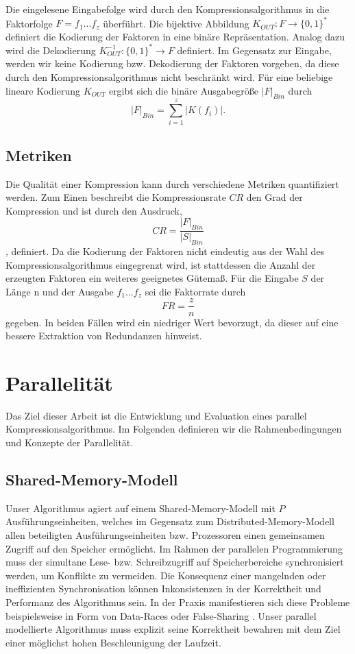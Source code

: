 Die eingelesene Eingabefolge wird durch den Kompressionsalgorithmus in die Faktorfolge $F=f_1...f_z$ überführt. Die bijektive Abbildung $K_{OUT}: F \rightarrow \{0,1\}^*$
definiert die Kodierung der Faktoren in eine binäre Repräsentation. Analog dazu wird die Dekodierung $K^{-1}_{OUT}: \{0,1\}^* \rightarrow F$ definiert. Im Gegensatz zur Eingabe, 
werden wir keine Kodierung bzw. Dekodierung der Faktoren vorgeben, da diese durch den Kompressionsalgorithmus nicht beschränkt wird. Für eine beliebige lineare Kodierung $K_{OUT}$ ergibt 
sich die binäre Ausgabegröße $|F|_{Bin}$ durch
\begin{equation}
    |F|_{Bin} = \sum_{i=1}^{z} |K(f_i)|.
\end{equation}

\subsection{Metriken}
Die Qualität einer Kompression kann durch verschiedene Metriken quantifiziert werden. Zum Einen beschreibt die Kompressionsrate $CR$ den Grad der Kompression und ist durch den
Ausdruck, 
\begin{equation}
    CR = \frac{|F|_{Bin}}{|S|_{Bin}}
\end{equation}
, definiert.
Da die Kodierung der Faktoren nicht eindeutig aus der Wahl des Kompressionsalgorithmus eingegrenzt wird, ist stattdessen die Anzahl der erzeugten Faktoren ein
weiteres geeignetes Gütemaß. Für die Eingabe $S$ der Länge n und der Ausgabe $f_1...f_z$ sei die Faktorrate durch
\begin{equation}
    FR = \frac{z}{n}
\end{equation}
gegeben. In beiden Fällen wird ein niedriger Wert bevorzugt, da dieser auf eine bessere Extraktion von Redundanzen hinweist.

\section{Parallelität}
Das Ziel dieser Arbeit ist die Entwicklung und Evaluation eines parallel Kompressionsalgorithmus. Im Folgenden definieren wir die Rahmenbedingungen und Konzepte der Parallelität.

\subsection{Shared-Memory-Modell}
Unser Algorithmus agiert auf einem Shared-Memory-Modell \cite{jaja} mit $P$ Ausführungseinheiten, welches im Gegensatz zum Distributed-Memory-Modell allen beteiligten 
Ausführungseinheiten bzw. Prozessoren einen gemeinsamen Zugriff auf den Speicher ermöglicht. Im Rahmen der parallelen Programmierung muss der simultane Lese- bzw. Schreibzugriff auf
Speicherbereiche synchronisiert werden, um Konflikte zu vermeiden. Die Konsequenz einer mangelnden oder ineffizienten Synchronisation können Inkonsistenzen in der Korrektheit und
Performanz des Algorithmus sein. In der Praxis manifestieren sich diese Probleme beispielsweise in Form von Data-Races oder False-Sharing \cite{parallelcomputing}. 
Unser parallel modellierte Algorithmus muss explizit seine Korrektheit bewahren mit dem Ziel einer möglichst hohen Beschleunigung der Laufzeit.

